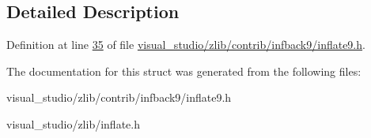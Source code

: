 \subsection{Detailed Description}


Definition at line \hyperlink{visual__studio_2zlib_2contrib_2infback9_2inflate9_8h_source_l00035}{35} of file \hyperlink{visual__studio_2zlib_2contrib_2infback9_2inflate9_8h_source}{visual\+\_\+studio/zlib/contrib/infback9/inflate9.\+h}.



The documentation for this struct was generated from the following files\+:\begin{DoxyCompactItemize}
\item 
visual\+\_\+studio/zlib/contrib/infback9/inflate9.\+h\item 
visual\+\_\+studio/zlib/inflate.\+h\end{DoxyCompactItemize}
